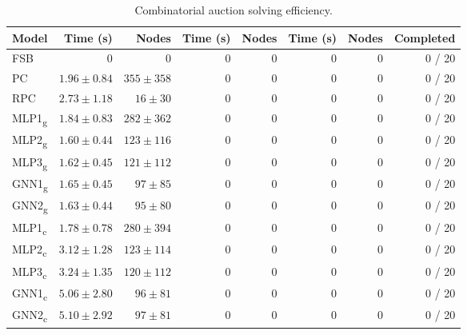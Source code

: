 \begin{scriptsize}
\begin{table}[ht]
\begin{tabular}{lrrrrrrr}
		Model & Time (s) & Nodes  & Time (s) & Nodes & Time (s) & Nodes & Completed\\
		\midrule
		FSB & 0 & 0 & 0 & 0 & 0 & 0 & 0 / 20\\
		PC  & $1.96 \pm 0.84$ & $355 \pm 358$ & 0 & 0 & 0 & 0 & 0 / 20\\
		RPC & $2.73 \pm 1.18$ & $16 \pm 30$ & 0 & 0 & 0 & 0 & 0 / 20\\
		\addlinespace
		MLP1\textsubscript{g} & $1.84 \pm 0.83$ & $282 \pm 362$ & 0 & 0 & 0 & 0 & 0 / 20\\
		MLP2\textsubscript{g} & $1.60 \pm 0.44$ & $123 \pm 116$ & 0 & 0 & 0 & 0 & 0 / 20\\
		MLP3\textsubscript{g} & $1.62 \pm 0.45$ & $121 \pm 112$ & 0 & 0 & 0 & 0 & 0 / 20\\
		GNN1\textsubscript{g} & $1.65 \pm 0.45$ & $97 \pm 85$ & 0 & 0 & 0 & 0 & 0 / 20\\
		GNN2\textsubscript{g} & $1.63 \pm 0.44$ & $95 \pm 80$ & 0 & 0 & 0 & 0 & 0 / 20\\
		\addlinespace
		MLP1\textsubscript{c} & $1.78 \pm 0.78$ & $280 \pm 394$ & 0 & 0 & 0 & 0 & 0 / 20\\
		MLP2\textsubscript{c} & $3.12 \pm 1.28$ & $123 \pm 114$ & 0 & 0 & 0 & 0 & 0 / 20\\
		MLP3\textsubscript{c} & $3.24 \pm 1.35$ & $120 \pm 112$ & 0 & 0 & 0 & 0 & 0 / 20\\
		GNN1\textsubscript{c} & $5.06 \pm 2.80$ & $96 \pm 81$ & 0 & 0 & 0 & 0 & 0 / 20\\
		GNN2\textsubscript{c} & $5.10 \pm 2.92$ & $97 \pm 81$ & 0 & 0 & 0 & 0 & 0 / 20\\
		\bottomrule
	\end{tabular}
	\caption{Combinatorial auction solving efficiency.}\label{tab:results1_cauction}
\end{table}
\end{scriptsize}

